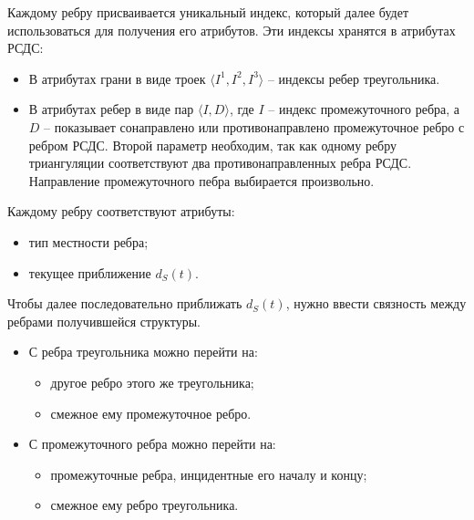 

Каждому ребру присваивается уникальный индекс, который далее
будет использоваться для получения его атрибутов.
Эти индексы хранятся в атрибутах РСДС:
\begin{itemize}
\item В атрибутах грани в виде троек $\langle I^1, I^2, I^3 \rangle$ --
индексы ребер треугольника.
\item В атрибутах ребер  в виде пар $\langle I, D \rangle$, где $I$ --
индекс промежуточного ребра, а $D$ -- показывает сонаправлено или
противонаправлено промежуточное ребро с ребром РСДС. Второй
параметр необходим, так как одному ребру триангуляции соответствуют
два противонаправленных ребра РСДС. Направление промежуточного пебра
выбирается произвольно.
\end{itemize}

Каждому ребру соответствуют атрибуты:
\begin{itemize}
\item тип местности ребра;
\item текущее приближение $d_S(t)$.
\end{itemize}

Чтобы далее последовательно приближать $d_S(t)$, нужно ввести связность между
ребрами получившейся структуры.
\begin{itemize}
\item С ребра треугольника можно перейти на:
  \begin{itemize}
  \item другое ребро этого же треугольника;
  \item смежное ему промежуточное ребро.
  \end{itemize}
\item С промежуточного ребра можно перейти на:
  \begin{itemize}
  \item промежуточные ребра, инцидентные его началу и концу;
  \item смежное ему ребро треугольника.
  \end{itemize}
\end{itemize}


